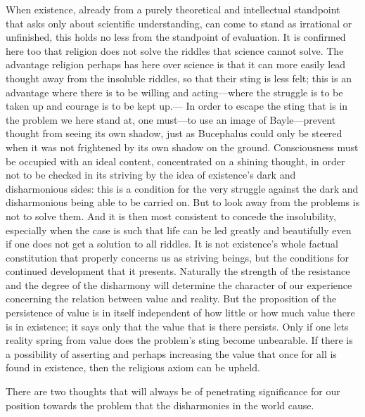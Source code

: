 \documentclass[12pt,a4paper]{book}
\newcommand{\opage}[1]{\marginnote{\footnotesize\textit{[#1]}}}
\begin{document}
When existence, already from a purely theoretical and intellectual standpoint that asks only about
scientific understanding, can come to stand as irrational or unfinished, this holds no less from the
standpoint of evaluation. It is confirmed here too that religion does not solve the riddles that science
cannot solve. The advantage religion perhaps has here over science is that it can more easily lead
thought away from the insoluble riddles, so that their sting is less felt; this is an advantage where
there is to be willing and acting---where the struggle is to be taken up and courage is to be kept up.---
In order to escape the sting that is in the problem we here stand at, one must---to use an image of
Bayle---prevent thought from seeing its own shadow, just as Bucephalus could only be steered when it
was not frightened by its own shadow on the ground. Consciousness must be occupied with an ideal
content, concentrated on a shining thought, in order not to be checked in its striving by the idea of
existence's dark and disharmonious sides: this is a condition for the very struggle against the dark and
disharmonious being able to be carried on. But to look away from the problems is not to solve them. And
it is then most consistent to concede the insolubility, especially when the case is such that life can
be led greatly and beautifully even if one does not get a solution to all riddles. It is not 
\opage{183}existence's
whole factual constitution that properly concerns us as striving beings, but the conditions for
continued development that it presents. Naturally the strength of the resistance and the degree of the
disharmony will determine the character of our experience concerning the relation between value and
reality. But the proposition of the persistence of value is in itself independent of how little or how
much value there is in existence; it says only that the value that is there persists. Only if one lets
reality spring from value does the problem's sting become unbearable. If there is a possibility of
asserting and perhaps increasing the value that once for all is found in existence, then the religious
axiom can be upheld.

There are two thoughts that will always be of penetrating significance for our position towards the
problem that the disharmonies in the world cause.
\end{document}
